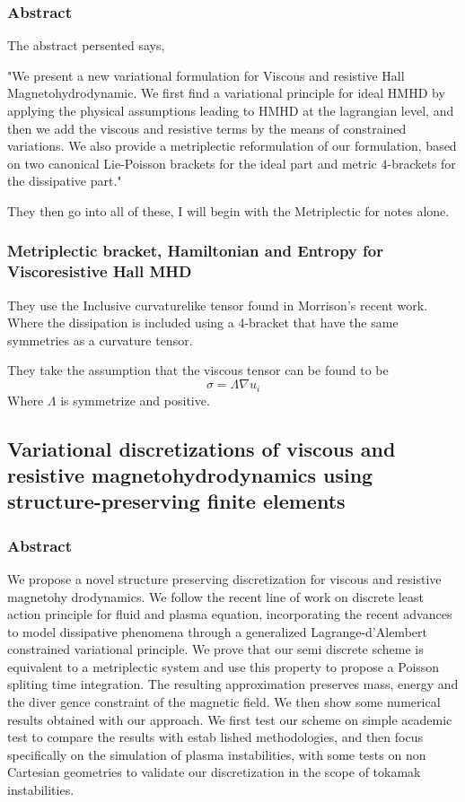 \subsubsection{Abstract}
The abstract persented says,

"We present a new variational formulation for Viscous and resistive Hall Magnetohydrodynamic. We first find a variational principle for ideal HMHD by applying the physical assumptions leading to HMHD at the lagrangian level, and then we add the viscous and resistive terms by the means of constrained variations. We also provide a metriplectic reformulation of our formulation, based on two canonical Lie-Poisson brackets for the ideal part and metric 4-brackets for the dissipative part."

They then go into all of these, I will begin with the Metriplectic for notes alone.
\subsubsection{Metriplectic bracket, Hamiltonian and Entropy for Viscoresistive Hall MHD}
They use the Inclusive curvaturelike tensor found in Morrison's recent work. Where the dissipation is included using a 4-bracket that have the same symmetries as a curvature tensor.

They take the assumption that the viscous  tensor can be found to be 
$$\sigma=\Lambda \nabla u_i$$
Where $\Lambda$ is symmetrize and positive.
\subsection{Variational discretizations of viscous and resistive
 magnetohydrodynamics using structure-preserving finite
 elements}
 \subsubsection{Abstract}
 We propose a novel structure preserving discretization for viscous and resistive magnetohy
drodynamics. We follow the recent line of work on discrete least action principle for fluid and
 plasma equation, incorporating the recent advances to model dissipative phenomena through
 a generalized Lagrange-d’Alembert constrained variational principle. We prove that our semi
discrete scheme is equivalent to a metriplectic system and use this property to propose a Poisson
 spliting time integration. The resulting approximation preserves mass, energy and the diver
gence constraint of the magnetic field. We then show some numerical results obtained with our
 approach. We first test our scheme on simple academic test to compare the results with estab
lished methodologies, and then focus specifically on the simulation of plasma instabilities, with
 some tests on non Cartesian geometries to validate our discretization in the scope of tokamak
 instabilities.

